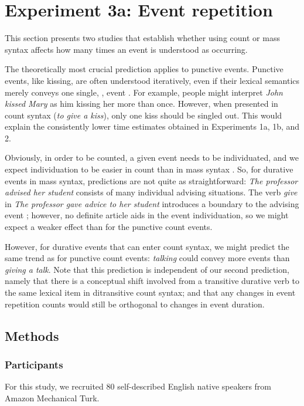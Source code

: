 \documentclass[preprint,12pt,authoryear]{elsarticle}
\begin{document}
\section{Experiment 3a: Event repetition}\label{sec_expHowMany}

This section presents two studies that establish whether using count or mass syntax affects how many times an event is understood as occurring. 

The theoretically most crucial prediction applies to punctive events. Punctive events, like kissing, are often understood iteratively, even if their lexical semantics merely conveys one single, , event \citep{Kim2015}. For example, people might interpret \emph{John kissed Mary} as him kissing her more than once. However, when presented in count syntax (\emph{to give a kiss}), only one kiss should be singled out. This would explain the consistently lower time estimates obtained in Experiments 1a, 1b, and 2.

Obviously, in order to be counted, a given event needs to be individuated, and we expect individuation to be easier in count than in mass syntax \citep{barner2008events}. So, for durative events in mass syntax, predictions are not quite as straightforward: \emph{The professor advised her student} consists of many individual advising situations. The  verb \emph{give} in \emph{The professor gave advice to her student} introduces a boundary to the advising event \citep{Krifka1992}; however, no definite article aids in the event individuation, so we might expect a weaker effect than for the punctive count events.

However, for durative events that can enter count syntax, we might predict the same trend as for punctive count events: \emph{talking} could convey more events than \emph{giving a talk}. Note that this prediction is independent of our second prediction, namely that there is a conceptual shift involved from a transitive durative verb to the same lexical item in ditransitive count syntax; and that any changes in event repetition counts would still be orthogonal to changes in event duration.

\subsection{Methods}\label{sec_methodHowMany}
\subsubsection{Participants} \label{sec_partHowMany}
For this study, we recruited 80 self-described English native speakers from Amazon Mechanical Turk.
\end{document}
